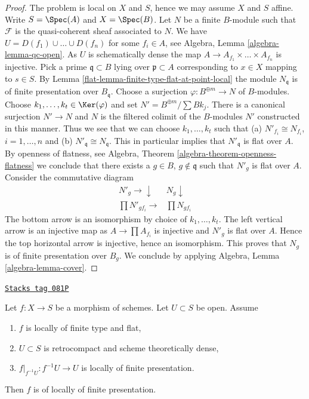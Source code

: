 \begin{proof}

The problem is local on $X$ and $S$, hence we may assume $X$ and $S$ affine.
Write $S = \Spec(A)$ and $X = \Spec(B)$. Let $N$ be a finite $B$-module such
that $\mathcal{F}$ is the quasi-coherent sheaf associated to $N$.
We have $U = D(f_1) \cup \ldots \cup D(f_n)$ for some $f_i \in A$, see
Algebra, Lemma \ref{algebra-lemma-qc-open}.
As $U$ is schematically dense the map
$A \to A_{f_1} \times \ldots \times A_{f_n}$ is injective.
Pick a prime $\mathfrak q \subset B$ lying over $\mathfrak p \subset A$
corresponding to $x \in X$ mapping to $s \in S$.
By Lemma \ref{flat-lemma-finite-type-flat-at-point-local}
the module $N_\mathfrak q$ is of finite presentation over $B_\mathfrak q$.
Choose a surjection $\varphi : B^{\oplus m} \to N$ of $B$-modules.
Choose $k_1, \ldots, k_t \in \Ker(\varphi)$ and
set $N' = B^{\oplus m}/\sum Bk_j$. There is a canonical surjection
$N' \to N$ and $N$ is the filtered colimit of the $B$-modules $N'$
constructed in this manner. Thus we see that we can choose
$k_1, \ldots, k_t$ such that (a) $N'_{f_i} \cong N_{f_i}$, $i = 1, \ldots, n$
and (b) $N'_\mathfrak q \cong N_\mathfrak q$.
This in particular implies that $N'_\mathfrak q$ is flat over $A$.
By openness of flatness, see
Algebra, Theorem \ref{algebra-theorem-openness-flatness}
we conclude that there exists a $g \in B$, $g \not \in \mathfrak q$
such that $N'_g$ is flat over $A$. Consider the commutative diagram
$$
\begin{array}{cc}N'_g \longrightarrow\downarrow & N_g \downarrow \\ \prod N'_{gf_i} \longrightarrow & \prod N_{gf_i}\end{array}
$$
The bottom arrow is an isomorphism by choice of $k_1, \ldots, k_t$.
The left vertical arrow is an injective map as
$A \to \prod A_{f_i}$ is injective and $N'_g$ is flat over $A$.
Hence the top horizontal arrow is injective, hence an isomorphism.
This proves that $N_g$ is of finite presentation over $B_g$.
We conclude by applying
Algebra, Lemma \ref{algebra-lemma-cover}.
\end{proof}

\begin{lemma}
\label{flat-lemma-flat-finite-type-finitely-presented-over-dense-open-X}
\href{https://stacks.math.columbia.edu/tag/081P}{\texttt{Stacks tag 081P}}

Let $f : X \to S$ be a morphism of schemes. Let $U \subset S$ be open.
Assume
\begin{enumerate}
\item $f$ is locally of finite type and flat,
\item $U \subset S$ is retrocompact and scheme theoretically dense,
\item $f|_{f^{-1}U} : f^{-1}U \to U$ is locally of finite presentation.
\end{enumerate}
Then $f$ is of locally of finite presentation.
\end{lemma}

